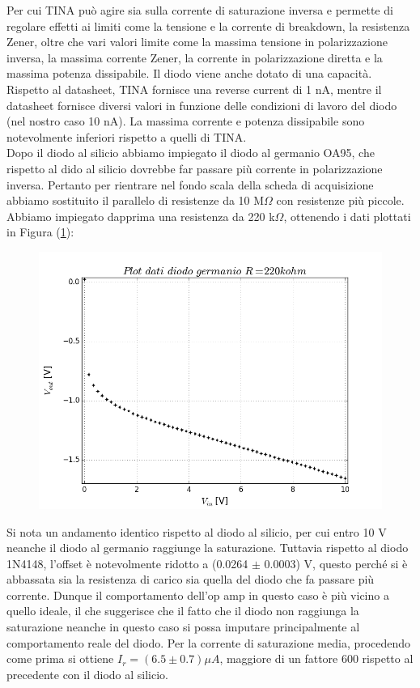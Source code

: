 \documentclass[journal, a4paper]{IEEEtran}
\begin{document}
Per cui TINA può agire sia sulla corrente di saturazione inversa e permette di regolare effetti ai limiti come la tensione e la corrente di breakdown, la resistenza Zener, oltre che vari valori limite come la massima tensione in polarizzazione inversa, la massima corrente Zener, la corrente in polarizzazione diretta e la massima potenza dissipabile. Il diodo viene anche dotato di una capacità. Rispetto al datasheet, TINA fornisce una reverse current di 1 nA, mentre il datasheet fornisce diversi valori in funzione delle condizioni di lavoro del diodo (nel nostro caso 10 nA). La massima corrente e potenza dissipabile sono notevolmente inferiori rispetto a quelli di TINA.\\

Dopo il diodo al silicio abbiamo impiegato il diodo al germanio OA95, che rispetto al dido al silicio dovrebbe far passare più corrente in polarizzazione inversa. Pertanto per rientrare nel fondo scala della scheda di acquisizione abbiamo sostituito il parallelo di resistenze da 10 M$\Omega$ con resistenze più piccole. Abbiamo impiegato dapprima una resistenza da 220 k$\Omega$, ottenendo i dati plottati in Figura (\ref{plotdiodo_germanio_220k}):\\

\begin{figure}[htp]
\caption{}
\label{plotdiodo_germanio_220k}
\centering
\includegraphics[scale=.35]{plotdiodo_germanio_220k}
\end{figure}

Si nota un andamento identico rispetto al diodo al silicio, per cui entro 10 V neanche il diodo al germanio raggiunge la saturazione. Tuttavia rispetto al diodo 1N4148, l'offset è notevolmente ridotto a (0.0264 $\pm$ 0.0003) V, questo perché si è abbassata sia la resistenza di carico sia quella del diodo che fa passare più corrente. Dunque il comportamento dell'op amp in questo caso è più vicino a quello ideale, il che suggerisce che il fatto che il diodo non raggiunga la saturazione neanche in questo caso si possa imputare principalmente al comportamento reale del diodo. Per la corrente di saturazione media, procedendo come prima si ottiene $I_r = (6.5 \pm 0.7) \mu A$, maggiore di un fattore 600 rispetto al precedente con il diodo al silicio.
\end{document}

